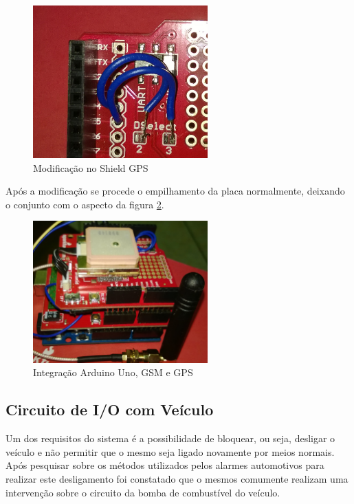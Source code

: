 \begin{figure}[!htb]
\centering
\includegraphics[width=0.6\textwidth]{figures/gpsMod.jpg}
\caption{Modificação no Shield GPS}
\label{fig:modgpsimpl}
\end{figure}  

Após a modificação se procede o empilhamento da placa normalmente, deixando o conjunto com o aspecto da figura \ref{fig:empunogpsgsm}.

\begin{figure}[!htb]
\centering
\includegraphics[width=0.6\textwidth]{figures/arduinoGSMGPS.jpg}
\caption{Integração Arduino Uno, GSM e GPS}
\label{fig:empunogpsgsm}
\end{figure}

\subsection{Circuito de I/O com Veículo}

Um dos requisitos do sistema é a possibilidade de bloquear, ou seja, desligar o veículo e não permitir que o mesmo seja ligado novamente por meios normais. Após pesquisar sobre os métodos utilizados pelos alarmes automotivos para realizar este desligamento foi constatado que o mesmos comumente realizam uma intervenção sobre o circuito da bomba de combustível do veículo.

